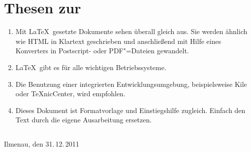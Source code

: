 

\chapter*{Thesen zur \artderausarbeitung}

\begin{enumerate}
\item Mit \LaTeX\ gesetzte Dokumente sehen überall
      gleich aus. Sie werden ähnlich wie HTML in Klartext
      geschrieben und anschließend mit Hilfe eines Konverters in
      Postscript- oder PDF"=Dateien gewandelt.
\item \LaTeX\ gibt es für alle wichtigen Betriebssysteme.
\item Die Benutzung einer integrierten Entwicklungsumgebung,
      beispielsweise {\ttfamily Kile} oder {\ttfamily TeXnicCenter},
      wird empfohlen.
\item Dieses Dokument ist Formatvorlage und Einstiegshilfe
      zugleich. Einfach den Text durch die eigene Ausarbeitung
      ersetzen.
\end{enumerate}

\section*{}

Ilmenau, den 31.\,12.\,2011\hfill \namedesautors
